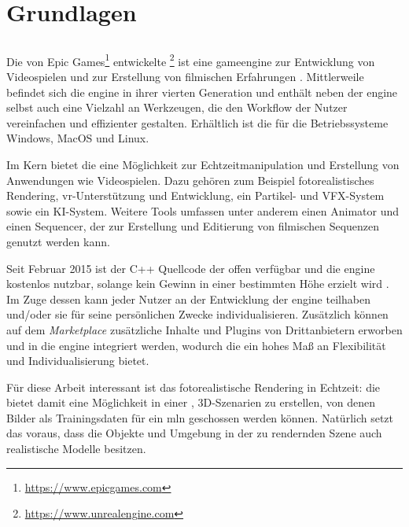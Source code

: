 \graphicspath{{./images/}}      
\def\CHAPTERONE{./chapters/Chapter-1} 

\chapter{Grundlagen}
\label{chap:software}
%	

\section{\unreal}
\label{sec:unrealengine}
Die von Epic Games\footnote{\url{https://www.epicgames.com}} entwickelte \unreal\footnote{\url{https://www.unrealengine.com}} ist eine \gls{gameengine} zur Entwicklung von Videospielen und zur Erstellung von filmischen Erfahrungen \cite{featUnreal}. Mittlerweile befindet sich die \acrshort{engine} in ihrer vierten Generation und enthält neben der \acrshort{engine} selbst auch eine Vielzahl an Werkzeugen, die den Workflow der Nutzer vereinfachen und effizienter gestalten. Erhältlich ist die \unreal für die Betriebssysteme Windows, MacOS und Linux. \par

Im Kern bietet die \unreal eine Möglichkeit zur Echtzeitmanipulation und Erstellung von Anwendungen wie Videospielen. Dazu gehören zum Beispiel fotorealistisches Rendering, \gls{vr}-Unterstützung und Entwicklung, ein Partikel- und VFX-System sowie ein KI-System. Weitere Tools umfassen unter anderem einen Animator und einen Sequencer, der zur Erstellung und Editierung von filmischen Sequenzen genutzt werden kann. \par 

Seit Februar 2015 ist der C++ Quellcode der \unreal offen verfügbar und die \acrshort{engine} kostenlos nutzbar, solange kein Gewinn in einer bestimmten Höhe erzielt wird \cite{freeUnreal}. Im Zuge dessen kann jeder Nutzer an der Entwicklung der \acrshort{engine} teilhaben und/oder sie für seine persönlichen Zwecke individualisieren. Zusätzlich können auf dem \textit{Marketplace} zusätzliche Inhalte und Plugins von Drittanbietern erworben und in die \acrshort{engine} integriert werden, wodurch die \unreal ein hohes Maß an Flexibilität und Individualisierung bietet. \par 

Für diese Arbeit interessant ist das fotorealistische Rendering in Echtzeit: die \unreal bietet damit eine Möglichkeit in einer , 3D-Szenarien zu erstellen, von denen Bilder als Trainingsdaten für ein \gls{mln} geschossen werden können. Natürlich setzt das voraus, dass die Objekte und Umgebung in der zu rendernden Szene auch realistische Modelle besitzen.     

